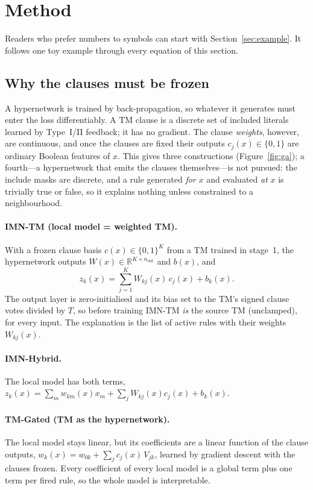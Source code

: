 \documentclass[10pt,a4paper]{article}
\newcommand{\arm}[1]{\textsf{#1}}
\begin{document}
\section{Method}\label{sec:method}
Readers who prefer numbers to symbols can start with Section~\ref{sec:example}. It follows one
toy example through every equation of this section.

\subsection{Why the clauses must be frozen}
A hypernetwork is trained by back-propagation, so whatever it generates must enter the loss
differentiably. A TM clause is a discrete set of included literals learned by Type~I/II feedback; it has
no gradient. The clause \emph{weights}, however, are continuous, and once the clauses are fixed their
outputs $c_j(x)\in\{0,1\}$ are ordinary Boolean features of $x$. This gives three constructions
(Figure~\ref{fig:ga}); a fourth---a hypernetwork that emits the clauses themselves---is not pursued: the
include masks are discrete, and a rule generated \emph{for} $x$ and evaluated \emph{at} $x$ is trivially
true or false, so it explains nothing unless constrained to a neighbourhood.

\paragraph{IMN-TM (local model = weighted TM).} With a frozen clause basis $c(x)\in\{0,1\}^K$ from a TM
trained in stage~1, the hypernetwork outputs $W(x)\in\mathbb{R}^{K\times n_\text{out}}$ and $b(x)$, and
\begin{equation}
  z_k(x)=\sum_{j=1}^{K} W_{kj}(x)\,c_j(x)+b_k(x).\label{eq:imntm}
\end{equation}
The output layer is zero-initialised and its bias set to the TM's signed clause votes divided by $T$, so
before training \arm{IMN-TM} \emph{is} the source TM (unclamped), for every input. The explanation is the
list of active rules with their weights $W_{kj}(x)$.

\paragraph{IMN-Hybrid.} The local model has both terms, $z_k(x)=\sum_m w_{km}(x)x_m+\sum_j W_{kj}(x)c_j(x)+b_k(x)$.

\paragraph{TM-Gated (TM as the hypernetwork).} The local model stays linear, but its coefficients are a
linear function of the clause outputs, $w_k(x)=w_{0k}+\sum_j c_j(x)\,V_{jk}$, learned by gradient descent
with the clauses frozen. Every coefficient of every local model is a global term plus one term per fired
rule, so the whole model is interpretable.
\end{document}
